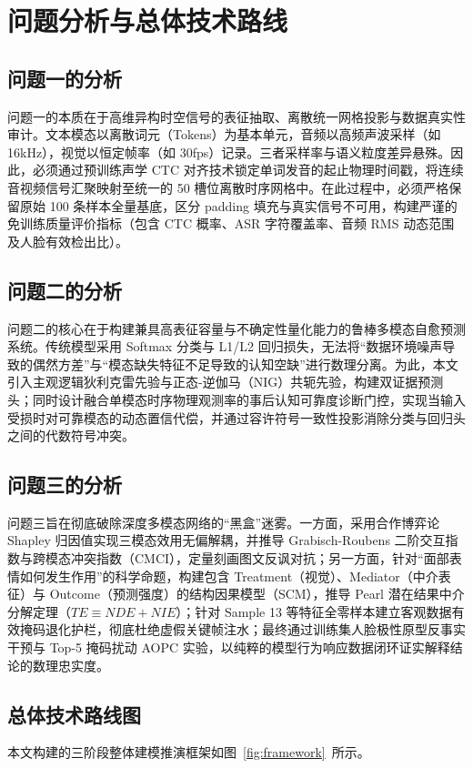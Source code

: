 \documentclass{huawei-mcm}
\begin{document}
\chapter{问题分析与总体技术路线}

\section{问题一的分析}
问题一的本质在于高维异构时空信号的表征抽取、离散统一网格投影与数据真实性审计。文本模态以离散词元（Tokens）为基本单元，音频以高频声波采样（如 16kHz），视觉以恒定帧率（如 30fps）记录。三者采样率与语义粒度差异悬殊。因此，必须通过预训练声学 CTC 对齐技术锁定单词发音的起止物理时间戳，将连续音视频信号汇聚映射至统一的 50 槽位离散时序网格中。在此过程中，必须严格保留原始 100 条样本全量基底，区分 padding 填充与真实信号不可用，构建严谨的免训练质量评价指标（包含 CTC 概率、ASR 字符覆盖率、音频 RMS 动态范围及人脸有效检出比）。

\section{问题二的分析}
问题二的核心在于构建兼具高表征容量与不确定性量化能力的鲁棒多模态自愈预测系统。传统模型采用 Softmax 分类与 L1/L2 回归损失，无法将“数据环境噪声导致的偶然方差”与“模态缺失特征不足导致的认知空缺”进行数理分离。为此，本文引入主观逻辑狄利克雷先验与正态-逆伽马（NIG）共轭先验，构建双证据预测头；同时设计融合单模态时序物理观测率的事后认知可靠度诊断门控，实现当输入受损时对可靠模态的动态置信代偿，并通过容许符号一致性投影消除分类与回归头之间的代数符号冲突。

\section{问题三的分析}
问题三旨在彻底破除深度多模态网络的“黑盒”迷雾。一方面，采用合作博弈论 Shapley 归因值实现三模态效用无偏解耦，并推导 Grabisch-Roubens 二阶交互指数与跨模态冲突指数（CMCI），定量刻画图文反讽对抗；另一方面，针对“面部表情如何发生作用”的科学命题，构建包含 Treatment（视觉）、Mediator（中介表征）与 Outcome（预测强度）的结构因果模型（SCM），推导 Pearl 潜在结果中介分解定理（$TE \equiv NDE + NIE$）；针对 Sample 13 等特征全零样本建立客观数据有效掩码退化护栏，彻底杜绝虚假关键帧注水；最终通过训练集人脸极性原型反事实干预与 Top-5 掩码扰动 AOPC 实验，以纯粹的模型行为响应数据闭环证实解释结论的数理忠实度。

\section{总体技术路线图}
本文构建的三阶段整体建模推演框架如图~\ref{fig:framework}~所示。
\end{document}

